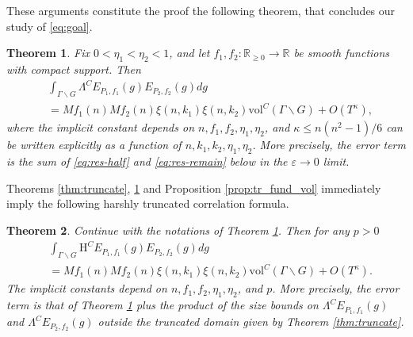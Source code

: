 \documentclass[11pt]{amsart}
\def\R{\mathbb{R}}
\newtheorem{theorem}{Theorem}
\numberwithin{theorem}{section}
\numberwithin{equation}{section}
\theoremstyle{remark}
\theoremstyle{definition}
\newcommand{\vol}{\mathrm{vol}}
\begin{document}
These arguments constitute the proof the following theorem, that concludes our study of \eqref{eq:goal}.
\begin{theorem} \label{thm:res_conc}
Fix $0 < \eta_1 < \eta_2 < 1$, and let $f_1,f_2:\R_{\geq 0} \rightarrow \R$ be smooth functions with compact support. Then
\begin{align*}
&\int_{\Gamma\backslash G} \Lambda^C E_{P_1,f_1}(g)E_{P_2,f_2}(g) dg \\ 
&= Mf_1(n)Mf_2(n)\xi(n,k_1)\xi(n,k_2)\vol^C(\Gamma\backslash G)+O\left(T^\kappa\right),
\end{align*}
where the implicit constant depends on $n,f_1,f_2,\eta_1,\eta_2$, and $\kappa \leq n(n^2-1)/6$ can be written explicitly as a function of $n,k_1,k_2,\eta_1,\eta_2$. More precisely, the error term is the sum of \eqref{eq:res-half} and \eqref{eq:res-remain} below in the $\varepsilon\rightarrow0$ limit.
\end{theorem}




Theorems \ref{thm:truncate}, \ref{thm:res_conc} and Proposition \ref{prop:tr_fund_vol} immediately imply the following harshly truncated correlation formula.
\begin{theorem} \label{thm:wanted}
Continue with the notations of Theorem \ref{thm:res_conc}. Then for any $p>0$
\begin{align*}
&\int_{\Gamma\backslash G} \mathrm H^CE_{P_1,f_1}(g)E_{P_2,f_2}(g) dg \\
&= Mf_1(n)Mf_2(n)\xi(n,k_1)\xi(n,k_2)\vol^C(\Gamma\backslash G) +O\left(T^\kappa\right).
\end{align*}
The implicit constants depend on $n,f_1,f_2,\eta_1,\eta_2$, and $p$. More precisely, the error term is that of Theorem \ref{thm:res_conc} plus the product of the size bounds on $\Lambda^CE_{P_1,f_1}(g)$ and $\Lambda^CE_{P_2,f_2}(g)$ outside the truncated domain given by Theorem \ref{thm:truncate}.
\end{theorem}
\end{document}
